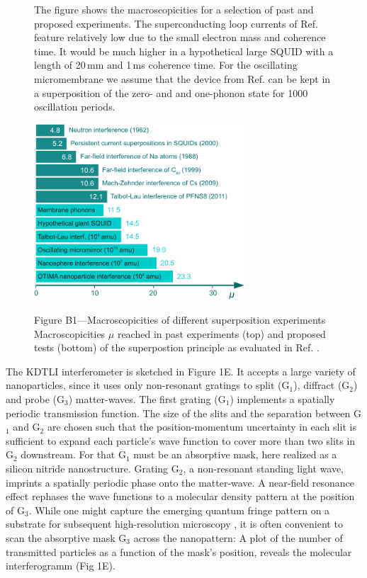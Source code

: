 \documentclass[11pt]{article}
\begin{document}
\begin{figure}
\begin{framed}
\hspace{1.5em}The figure shows the macroscopicities for a selection of past and proposed experiments. The superconducting loop currents of Ref.  feature relatively low
due to the small electron mass and coherence time. It would be much higher in a hypothetical large SQUID with a length of 20\,mm and 1\,ms coherence time. For the oscillating micromembrane we assume that the device from Ref.  can be kept in a superposition of the zero- and  and one-phonon state for 1000 oscillation periods.

\centerline{
\includegraphics[width=0.7\textwidth]{FigB.pdf}}
{\small\noindent
{Figure B1---Macroscopicities of different superposition experiments}
Macroscopicities $\mu$ reached in past experiments (top) and proposed tests (bottom) of the superpostion principle  as evaluated in Ref. .
}
\end{framed}
\end{figure}


The KDTLI interferometer is sketched in Figure 1E. It accepts a large variety of nanoparticles,
since it uses only non-resonant gratings to split (G$_1$), 
diffract (G$_2$) and probe (G$_3$) matter-waves.
The first grating (G$_1$) implements a spatially periodic transmission function. 
The size of the slits and the separation between G$_1$ and G$_2$ are chosen such that the position-momentum uncertainty in each
slit is sufficient to expand each particle's wave function to cover more than two slits
in G$_2$ downstream. For that G$_1$ must be an absorptive mask, here realized as a silicon nitride nanostructure.
Grating G$_2$, a non-resonant standing light wave, imprints a spatially periodic phase onto the matter-wave.
A near-field resonance effect rephases the wave functions to a molecular density pattern at the position of G$_3$.
While one might capture the emerging quantum fringe pattern on a substrate for subsequent high-resolution microscopy \cite{Juffmann2009, Juffmann2012a},
it is often convenient to scan the absorptive mask G$_3$ across the nanopattern: 
A plot of the number of transmitted particles as a function of the mask's position, reveals the molecular interferogramm (Fig 1E).
\end{document}
